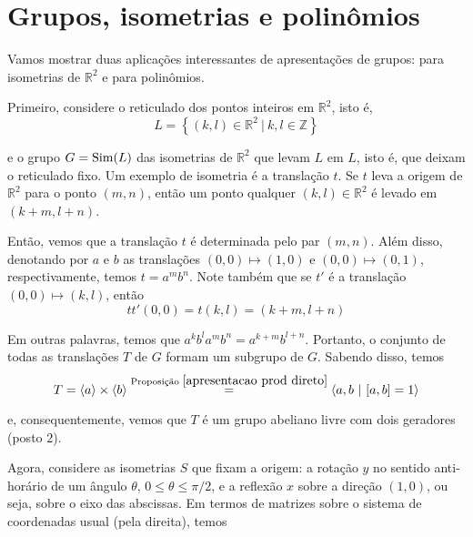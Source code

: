 	\section{Grupos, isometrias e polinômios}
	\hspace{12pt} Vamos mostrar duas aplicações interessantes de apresentações de grupos: para isometrias de $\mathbb{R}^2$ e para polinômios.
	\par\vspace{0.3cm} Primeiro, considere o reticulado dos pontos inteiros em $\mathbb{R}^2$, isto é,
	\begin{equation*}
	L = \left\{ (k,l)\in\mathbb{R}^2 \ | \ k,l\in\mathbb{Z} \right\}
	\end{equation*}
	\par\vspace{0.3cm} e o grupo $G = \operatorname{Sim}(L)$ das isometrias de $\mathbb{R}^2$ que levam $L$ em $L$, isto é, que deixam o reticulado fixo. Um exemplo de isometria é a translação $t$. Se $t$ leva a origem de $\mathbb{R}^2$ para o ponto $(m,n)$, então um ponto qualquer $(k,l)\in\mathbb{R}^2$ é levado em $(k+m, l+n)$.
	\par\vspace{0.3cm} Então, vemos que a translação $t$ é determinada pelo par $(m,n)$. Além disso, denotando por $a$ e $b$ as translações $(0,0)\mapsto (1,0)$ e $(0,0)\mapsto(0,1)$, respectivamente, temos $t = a^mb^n$. Note também que se $t'$ é a translação $(0,0)\mapsto(k,l)$, então 
	\begin{equation*}
	tt'(0,0) = t(k,l) = (k+m, l+n)
	\end{equation*}
	\par\vspace{0.3cm} Em outras palavras, temos que $a^kb^la^mb^n = a^{k+m}b^{l+n}$. Portanto, o conjunto de todas as translações $T$ de $G$ formam um subgrupo de $G$. Sabendo disso, temos
	\begin{equation*}
	T = \langle a \rangle \times \langle b \rangle \stackrel{\text{Proposição }\eqref{apresentacao prod direto}}{=} \langle a,b \ | \ [a,b]=1 \rangle 
	\end{equation*} 
	\par\vspace{0.3cm} e, consequentemente, vemos que $T$ é um grupo abeliano livre com dois geradores (posto $2$).
	\par\vspace{0.3cm} Agora, considere as isometrias $S$ que fixam a origem: a rotação $y$ no sentido anti-horário de um ângulo $\theta$, $0\leq \theta\leq \pi/2$, e a reflexão $x$ sobre a direção $(1,0)$, ou seja, sobre o eixo das abscissas. Em termos de matrizes sobre o sistema de coordenadas usual (pela direita), temos
